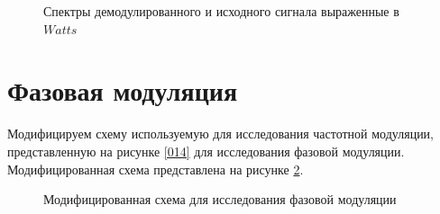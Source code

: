 \documentclass[a4paper,14pt]{extarticle}
\begin{document}
\begin{figure}[H]
\caption{Спектры демодулированного и исходного сигнала выраженные в $Watts$}
\label{018}
\end{figure}

\section{Фазовая модуляция}

Модифицируем схему используемую для исследования частотной модуляции, представленную на рисунке \ref{014} для исследования фазовой модуляции. Модифицированная схема представлена на рисунке \ref{019}.

\begin{figure}[H]
\begin{minipage}[h]{0.69\linewidth}
\end{minipage}
\hfill
\begin{minipage}[h]{0.29\linewidth}
\end{minipage}
\caption{Модифицированная схема для исследования фазовой модуляции}
\label{019}
\end{figure}
\end{document}

